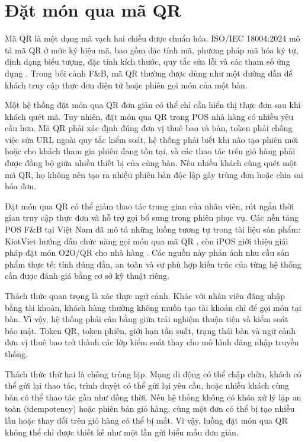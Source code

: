 \section{Đặt món qua mã QR}

Mã QR là một dạng mã vạch hai chiều được chuẩn hóa. ISO/IEC 18004:2024 mô tả mã QR ở mức ký hiệu mã, bao gồm đặc tính mã, phương pháp mã hóa ký tự, định dạng biểu tượng, đặc tính kích thước, quy tắc sửa lỗi và các tham số ứng dụng \cite{iso-iec-18004-2024}. Trong bối cảnh F\&B, mã QR thường được dùng như một đường dẫn để khách truy cập thực đơn điện tử hoặc phiên gọi món của một bàn.

Một hệ thống đặt món qua QR đơn giản có thể chỉ cần hiển thị thực đơn sau khi khách quét mã. Tuy nhiên, đặt món qua QR trong POS nhà hàng có nhiều yêu cầu hơn. Mã QR phải xác định đúng đơn vị thuê bao và bàn, token phải chống việc sửa URL ngoài quy tắc kiểm soát, hệ thống phải biết khi nào tạo phiên mới hoặc cho khách tham gia phiên đang tồn tại, và các thao tác trên giỏ hàng phải được đồng bộ giữa nhiều thiết bị của cùng bàn. Nếu nhiều khách cùng quét một mã QR, họ không nên tạo ra nhiều phiên bàn độc lập gây trùng đơn hoặc chia sai hóa đơn.

Đặt món qua QR có thể giảm thao tác trung gian của nhân viên, rút ngắn thời gian truy cập thực đơn và hỗ trợ gọi bổ sung trong phiên phục vụ. Các nền tảng POS F\&B tại Việt Nam đã mô tả những luồng tương tự trong tài liệu sản phẩm: KiotViet hướng dẫn chức năng gọi món qua mã QR \cite{kiotviet-qr-order-doc}, còn iPOS giới thiệu giải pháp đặt món O2O/QR cho nhà hàng \cite{ipos-o2o-qr-order}. Các nguồn này phản ánh nhu cầu sản phẩm thực tế; tính đúng đắn, an toàn và sự phù hợp kiến trúc của từng hệ thống cần được đánh giá bằng cơ sở kỹ thuật riêng.

Thách thức quan trọng là xác thực ngữ cảnh. Khác với nhân viên đăng nhập bằng tài khoản, khách hàng thường không muốn tạo tài khoản chỉ để gọi món tại bàn. Vì vậy, hệ thống phải cân bằng giữa trải nghiệm thuận tiện và kiểm soát bảo mật. Token QR, token phiên, giới hạn tần suất, trạng thái bàn và ngữ cảnh đơn vị thuê bao trở thành các lớp kiểm soát thay cho mô hình đăng nhập truyền thống.

Thách thức thứ hai là chống trùng lặp. Mạng di động có thể chập chờn, khách có thể gửi lại thao tác, trình duyệt có thể gửi lại yêu cầu, hoặc nhiều khách cùng bàn có thể thao tác gần như đồng thời. Nếu hệ thống không có khóa xử lý lặp an toàn (idempotency) hoặc phiên bản giỏ hàng, cùng một đơn có thể bị tạo nhiều lần hoặc thay đổi trên giỏ hàng có thể bị mất. Vì vậy, luồng đặt món qua QR không thể chỉ được thiết kế như một lần gửi biểu mẫu đơn giản.

